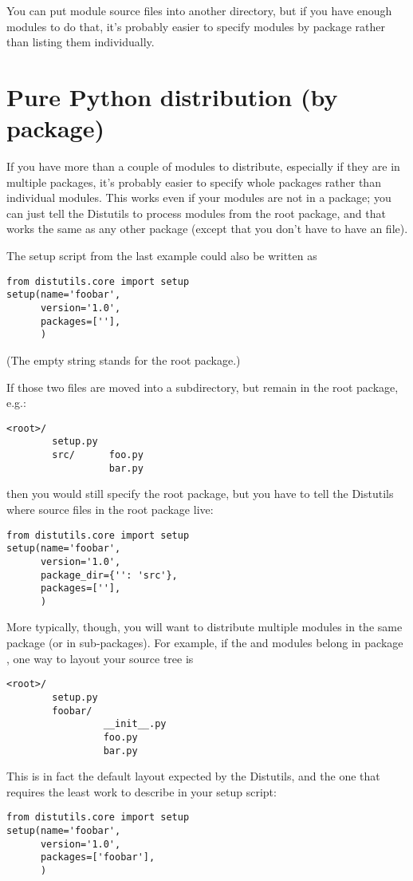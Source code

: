 \documentclass{manual}
\begin{document}
You can put module source files into another directory, but if you have
enough modules to do that, it's probably easier to specify modules by
package rather than listing them individually.


\section{Pure Python distribution (by package)}
\label{pure-pkg}

If you have more than a couple of modules to distribute, especially if
they are in multiple packages, it's probably easier to specify whole
packages rather than individual modules.  This works even if your
modules are not in a package; you can just tell the Distutils to process
modules from the root package, and that works the same as any other
package (except that you don't have to have an 
file).

The setup script from the last example could also be written as
\begin{verbatim}
from distutils.core import setup
setup(name='foobar',
      version='1.0',
      packages=[''],
      )
\end{verbatim}
(The empty string stands for the root package.)

If those two files are moved into a subdirectory, but remain in the root
package, e.g.:
\begin{verbatim}
<root>/
        setup.py
        src/      foo.py
                  bar.py
\end{verbatim}
then you would still specify the root package, but you have to tell the
Distutils where source files in the root package live:
\begin{verbatim}
from distutils.core import setup
setup(name='foobar',
      version='1.0',
      package_dir={'': 'src'},
      packages=[''],
      )
\end{verbatim}

More typically, though, you will want to distribute multiple modules in
the same package (or in sub-packages).  For example, if the  
and  modules belong in package , one way to
layout your source tree is
\begin{verbatim}
<root>/
        setup.py
        foobar/
                 __init__.py
                 foo.py
                 bar.py
\end{verbatim}
This is in fact the default layout expected by the Distutils, and the
one that requires the least work to describe in your setup script:
\begin{verbatim}
from distutils.core import setup
setup(name='foobar',
      version='1.0',
      packages=['foobar'],
      )
\end{verbatim}
\end{document}
